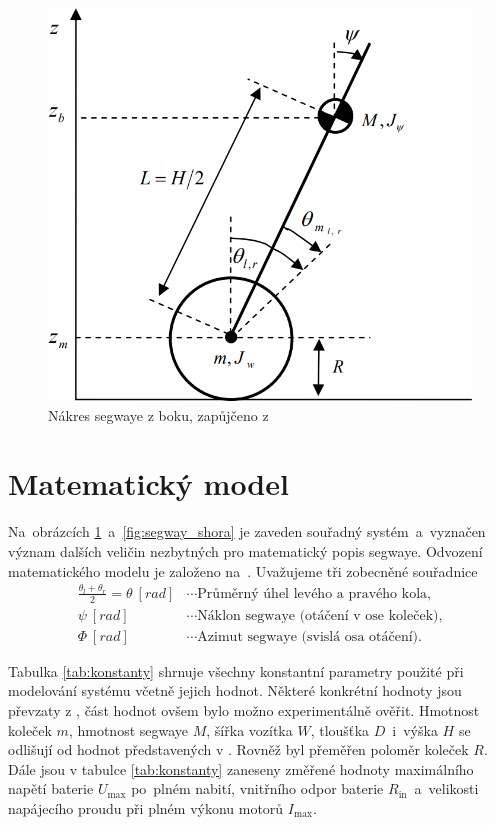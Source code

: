 \documentclass[conference]{IEEEtran}
\begin{document}
\begin{figure}[htbp]
    \centerline{\includegraphics[width=0.9\linewidth]{segway_bok.png}}
    \caption{Nákres segwaye z boku, zapůjčeno z \cite{model_based_design}}
    \label{fig:segway_bok}        
\end{figure}

\section{Matematický model}
Na~obrázcích \ref{fig:segway_bok}~a~\ref{fig:segway_shora} je zaveden souřadný systém~a~vyznačen význam dalších veličin
nezbytných pro matematický popis segwaye. Odvození matematického modelu je založeno na~\cite{model_based_design}.
Uvažujeme tři zobecněné souřadnice
\begin{equation*}
    \begin{aligned}
        \frac{\theta_l + \theta_r}{2} = \theta~ [\si{rad}] &\cdots \text{Průměrný úhel levého~a~pravého kola,} \\
        \psi ~[\si{rad}] &\cdots \text{Náklon segwaye (otáčení v ose koleček),} \\
        \varPhi~[\si{rad}] &\cdots \text{Azimut segwaye (svislá osa otáčení).}
    \end{aligned}
\end{equation*}



Tabulka \ref{tab:konstanty} shrnuje všechny konstantní parametry použité při modelování systému včetně jejich hodnot.
Některé konkrétní hodnoty jsou převzaty z \cite{model_based_design}, část hodnot ovšem bylo možno experimentálně ověřit.
Hmotnost koleček $m$, hmotnost segwaye $M$, šířka vozítka $W$, tloušťka $D$~i~výška $H$ se odlišují od hodnot
představených v \cite{model_based_design}. Rovněž byl přeměřen poloměr koleček $R$.
Dále jsou v tabulce \ref{tab:konstanty} zaneseny změřené hodnoty maximálního napětí baterie $U_\text{max}$ po~plném nabití,
vnitřního odpor baterie $R_\text{in}$~a~velikosti napájecího proudu při plném výkonu motorů $I_\text{max}$.
\end{document}
